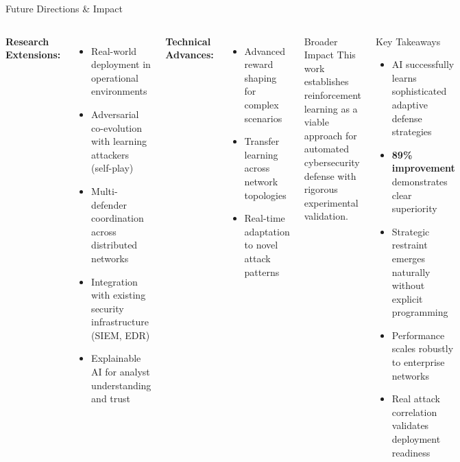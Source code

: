 \documentclass[aspectratio=169,xcolor=dvipsnames]{beamer}
\begin{document}
\begin{frame}{Future Directions \& Impact}
\scriptsize
\setlength{\parskip}{0pt}
\setlength{\topsep}{0pt}
\begin{columns}[t]
  \textbf{Research Extensions:}
  \vspace{2pt}
  {\setlength{\parskip}{0pt}%
   \begin{itemize}
     \item Real-world deployment in operational environments
     \item Adversarial co-evolution with learning attackers (self-play)
     \item Multi-defender coordination across distributed networks
     \item Integration with existing security infrastructure (SIEM, EDR)
     \item Explainable AI for analyst understanding and trust
   \end{itemize}
  }

  \vspace{4pt}
  \textbf{Technical Advances:}
  \vspace{2pt}
  {\setlength{\parskip}{0pt}%
   \begin{itemize}
     \item Advanced reward shaping for complex scenarios
     \item Transfer learning across network topologies
     \item Real-time adaptation to novel attack patterns
   \end{itemize}
  }

  \begin{block}{Broader Impact}
  \tiny
  This work establishes reinforcement learning as a viable approach for automated cybersecurity defense with rigorous experimental validation.
  \end{block}

  \vspace{4pt}
  \begin{block}{Key Takeaways}
  \tiny
  \begin{itemize}
      \item AI successfully learns sophisticated adaptive defense strategies
      \item \textbf{89\% improvement} demonstrates clear superiority
      \item Strategic restraint emerges naturally without explicit programming
      \item Performance scales robustly to enterprise networks
      \item Real attack correlation validates deployment readiness
  \end{itemize}
  \end{block}
\end{columns}
\end{frame}
\end{document}
